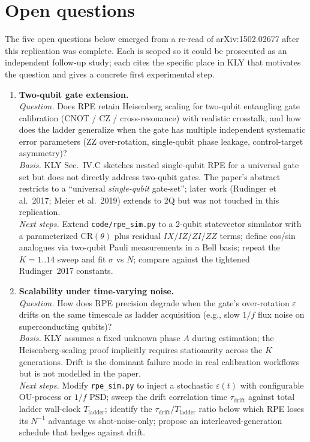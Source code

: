 \section{Open questions}

The five open questions below emerged from a re-read of arXiv:1502.02677
after this replication was complete. Each is scoped so it could be
prosecuted as an independent follow-up study; each cites the specific
place in KLY that motivates the question and gives a concrete first
experimental step.

\begin{enumerate}
\item \textbf{Two-qubit gate extension.}\\
  \emph{Question.} Does RPE retain Heisenberg scaling for two-qubit
  entangling gate calibration (CNOT / CZ / cross-resonance) with
  realistic crosstalk, and how does the ladder generalize when the gate
  has multiple independent systematic error parameters (ZZ
  over-rotation, single-qubit phase leakage, control-target asymmetry)?\\
  \emph{Basis.} KLY Sec.~IV.C sketches nested single-qubit RPE for a
  universal gate set but does not directly address two-qubit gates. The
  paper's abstract restricts to a ``universal \emph{single-qubit}
  gate-set''; later work (Rudinger et al.~2017; Meier et al.~2019)
  extends to 2Q but was not touched in this replication.\\
  \emph{Next steps.} Extend \texttt{code/rpe\_sim.py} to a 2-qubit
  statevector simulator with a parameterized $\mathrm{CR}(\theta)$ plus
  residual $IX/IZ/ZI/ZZ$ terms; define cos/sin analogues via two-qubit
  Pauli measurements in a Bell basis; repeat the $K=1..14$ sweep and
  fit $\sigma$ vs $N$; compare against the tightened Rudinger~2017
  constants.

\item \textbf{Scalability under time-varying noise.}\\
  \emph{Question.} How does RPE precision degrade when the gate's
  over-rotation $\varepsilon$ drifts on the same timescale as ladder
  acquisition (e.g., slow $1/f$ flux noise on superconducting qubits)?\\
  \emph{Basis.} KLY assumes a fixed unknown phase $A$ during
  estimation; the Heisenberg-scaling proof implicitly requires
  stationarity across the $K$ generations. Drift is the dominant
  failure mode in real calibration workflows but is not modelled in the
  paper.\\
  \emph{Next steps.} Modify \texttt{rpe\_sim.py} to inject a stochastic
  $\varepsilon(t)$ with configurable OU-process or $1/f$ PSD; sweep the
  drift correlation time $\tau_{\text{drift}}$ against total ladder
  wall-clock $T_{\text{ladder}}$; identify the
  $\tau_{\text{drift}}/T_{\text{ladder}}$ ratio below which RPE loses
  its $N^{-1}$ advantage vs shot-noise-only; propose an
  interleaved-generation schedule that hedges against drift.


\end{enumerate}
